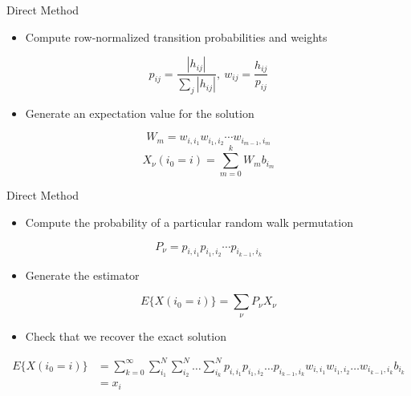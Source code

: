 \documentclass{beamer}
\begin{document}
\begin{frame}{Direct Method}

  \begin{itemize}
  \item Compute row-normalized transition probabilities and weights
  \end{itemize}

  \[
  p_{ij} = \frac{|h_{ij}|}{\sum_j |h_{ij}|},\ w_{ij} =
  \frac{h_{ij}}{p_{ij}}
  \]

  \begin{itemize}
  \item Generate an expectation value for the solution
  \end{itemize}

  \[
  W_{m} = w_{i,i_1} w_{i_1,i_2} \cdots w_{i_{m-1},i_m}
  \]
  \[
  X_{\nu}(i_0 = i) = \sum_{m=0}^k W_{m} b_{i_m}
  \]
\end{frame}

\begin{frame}{Direct Method}

  \begin{itemize}
  \item Compute the probability of a particular random walk
    permutation
  \end{itemize}

  \[
  P_{\nu} = p_{i,i_1} p_{i_1,i_2} \cdots p_{i_{k-1},i_k}
  \]

  \begin{itemize}
  \item Generate the estimator
  \end{itemize}

  \[
  E\{X(i_0 = i)\} = \sum_{\nu} P_{\nu} X_{\nu}
  \]

  \begin{itemize}
  \item Check that we recover the exact solution
  \end{itemize}

  \[
  \begin{split}
    E\{X(i_0 = i)\}
    &=\sum_{k=0}^{\infty}\sum_{i_1}^{N}\sum_{i_2}^{N}\ldots
    \sum_{i_k}^{N} p_{i,i_1}p_{i_1,i_2}\ldots p_{i_{k-1},i_k}
    w_{i,i_1}w_{i_1,i_2}\ldots w_{i_{k-1},i_k} b_{i_k}\\ &= x_i
  \end{split}
  \]

\end{frame}
\end{document}
